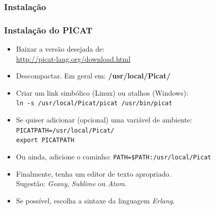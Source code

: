 \subsubsection{Instalação}
\begin{frame}[fragile]
    \frametitle{Instalação do PICAT}

  \begin{itemize}
  
  	\item Baixar a versão desejada de:\\ 
    \hspace{8mm} \url{http://picat-lang.org/download.html}
    
   	\item Descompactar. Em geral em: \textbf{/usr/local/Picat/}
    
    \item Criar um link simbólico (Linux) ou atalhos (Windows):\\ 
    
   	\hspace{8mm}\texttt{ln -s /usr/local/Picat/picat   \hspace{3mm}   /usr/bin/picat}
    
    \item Se quiser adicionar (opcional) uma variável de ambiente:\\
          \hspace{8mm} \texttt{PICATPATH=/usr/local/Picat/}\\
          \hspace{8mm} \texttt{export PICATPATH}

    \item Ou ainda, adicione o caminho: \texttt{PATH=\$PATH:/usr/local/Picat}

   	\item Finalmente, tenha um editor de texto apropriado.\\
    \hspace{8mm} Sugestão: \textit{Geany}, \textit{Sublime} ou \textit{Atom}.
     
    \item Se possível, escolha a sintaxe da linguagem \textit{Erlang}.
    
    
  \end{itemize}



\end{frame}


